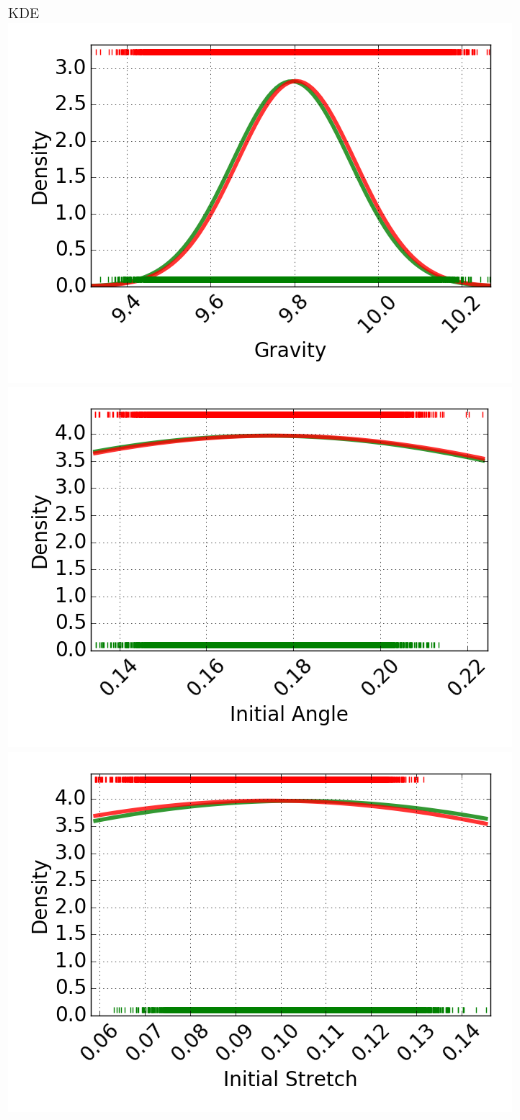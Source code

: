 \documentclass{beamer}
\begin{document}
\begin{frame}{KDE}
\centering
\includegraphics[scale=0.22]{images/KDE_Gravity.png}
\includegraphics[scale=0.22]{images/KDE_InitialAngle.png}
\includegraphics[scale=0.22]{images/KDE_InitialStretch.png}

\end{frame}
\end{document}
